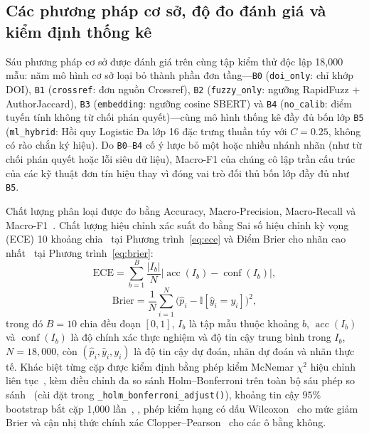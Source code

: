 \subsection{Các phương pháp cơ sở, độ đo đánh giá và kiểm định thống kê}

Sáu phương pháp cơ sở được đánh giá trên cùng tập kiểm thử độc lập 18,000 mẫu: năm mô hình cơ sở loại bỏ thành phần đơn tầng---\texttt{B0} (\texttt{doi\_only}: chỉ khớp DOI), \texttt{B1} (\texttt{crossref}: đơn nguồn Crossref), \texttt{B2} (\texttt{fuzzy\_only}: ngưỡng RapidFuzz + AuthorJaccard), \texttt{B3} (\texttt{embedding}: ngưỡng cosine SBERT) và \texttt{B4} (\texttt{no\_calib}: điểm tuyến tính không từ chối phán quyết)---cùng mô hình thống kê đầy đủ bốn lớp \texttt{B5} (\texttt{ml\_hybrid}: Hồi quy Logistic Đa lớp 16 đặc trưng thuần túy với $C = 0.25$, không có rào chắn ký hiệu). Do \texttt{B0}--\texttt{B4} cố ý lược bỏ một hoặc nhiều nhánh nhãn (như từ chối phán quyết hoặc lỗi siêu dữ liệu), Macro-F1 của chúng cô lập trần cấu trúc của các kỹ thuật đơn tín hiệu thay vì đóng vai trò đối thủ bốn lớp đầy đủ như \texttt{B5}.

Chất lượng phân loại được đo bằng Accuracy, Macro-Precision, Macro-Recall và Macro-F1~\cite{Chawla2009}. Chất lượng hiệu chỉnh xác suất đo bằng Sai số hiệu chỉnh kỳ vọng (ECE) 10 khoảng chia~\cite{guo2017} tại Phương trình~\eqref{eq:ece} và Điểm Brier cho nhãn cao nhất~\cite{brier1950} tại Phương trình~\eqref{eq:brier}:
\begin{equation}\label{eq:ece}
\text{ECE} = \sum_{b=1}^{B} \frac{|I_b|}{N} \bigl|\operatorname{acc}(I_b) - \operatorname{conf}(I_b)\bigr|,
\end{equation}
\begin{equation}\label{eq:brier}
\text{Brier} = \frac{1}{N} \sum_{i=1}^{N} \bigl(\hat{p}_i - \mathbb{I}[\hat{y}_i = y_i]\bigr)^2,
\end{equation}
trong đó $B = 10$ chia đều đoạn $[0, 1]$, $I_b$ là tập mẫu thuộc khoảng $b$, $\operatorname{acc}(I_b)$ và $\operatorname{conf}(I_b)$ là độ chính xác thực nghiệm và độ tin cậy trung bình trong $I_b$, $N = 18{,}000$, còn $(\hat{p}_i, \hat{y}_i, y_i)$ là độ tin cậy dự đoán, nhãn dự đoán và nhãn thực tế. Khác biệt từng cặp được kiểm định bằng phép kiểm McNemar $\chi^2$ hiệu chỉnh liên tục~\cite{mcnemar1947}, \cite{dietterich1998approximate} kèm điều chỉnh đa so sánh Holm--Bonferroni trên toàn bộ sáu phép so sánh~\cite{holm1979simple} (cài đặt trong \texttt{\_holm\_bonferroni\_adjust()}), khoảng tin cậy $95\%$ bootstrap bắt cặp 1,000 lần~\cite{bergkirkpatrick2012empirical}, \cite{dror2018hitchhiker}, phép kiểm hạng có dấu Wilcoxon~\cite{wilcoxon1945} cho mức giảm Brier và cận nhị thức chính xác Clopper--Pearson~\cite{clopper1934} cho các ô bằng không.

